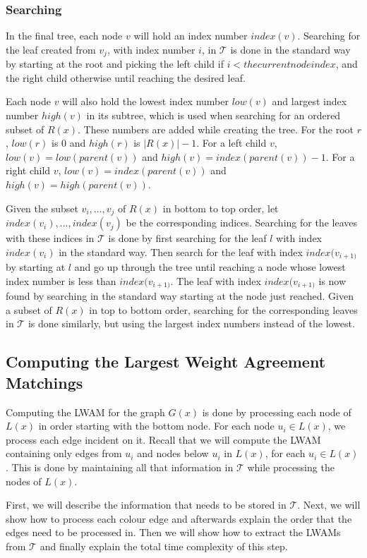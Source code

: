 \subsubsection{Searching}
\label{st_searching}
In the final tree, each node $v$ will hold an index number $index(v)$. Searching for the leaf created from $v_j$, with index number $i$, in $\mathcal{T}$ is done in the standard way by starting at the root and picking the left child if $i < the current node index$, and the right child otherwise until reaching the desired leaf.

Each node $v$ will also hold the lowest index number $low(v)$ and largest index number $high(v)$ in its subtree, which is used when searching for an ordered subset of $R(x)$. These numbers are added while creating the tree. For the root $r$, $low(r)$ is 0 and $high(r)$ is $|R(x)|-1$. For a left child $v$, $low(v)=low(parent(v))$ and $high(v)=index(parent(v))-1$. For a right child $v$, $low(v)=index(parent(v))$ and $high(v)=high(parent(v))$.

Given the subset ${v_i, ..., v_j}$ of $R(x)$ in bottom to top order, let ${index(v_i), ..., index(v_j)}$ be the corresponding indices. Searching for the leaves with these indices in $\mathcal{T}$ is done by first searching for the leaf $l$ with index $index(v_i)$ in the standard way. Then search for the leaf with index $index(v_{i+1)}$ by starting at $l$ and go up through the tree until reaching a node whose lowest index number is less than $index(v_{i+1)}$. The leaf with index $index(v_{i+1)}$ is now found by searching in the standard way starting at the node just reached. Given a subset of $R(x)$ in top to bottom order, searching for the corresponding leaves in $\mathcal{T}$ is done similarly, but using the largest index numbers instead of the lowest.

\subsection{Computing the Largest Weight Agreement Matchings}
Computing the LWAM for the graph $G(x)$ is done by processing each node of $L(x)$ in order starting with the bottom node. For each node $u_i \in L(x)$, we process each edge incident on it. Recall that we will compute the LWAM containing only edges from $u_i$ and nodes below $u_i$ in $L(x)$, for each $u_i \in L(x)$. This is done by maintaining all that information in $\mathcal{T}$ while processing the nodes of $L(x)$.

First, we will describe the information that needs to be stored in $\mathcal{T}$. Next, we will show how to process each colour edge and afterwards explain the order that the edges need to be processed in. Then we will show how to extract the LWAMs from $\mathcal{T}$ and finally explain the total time complexity of this step.

